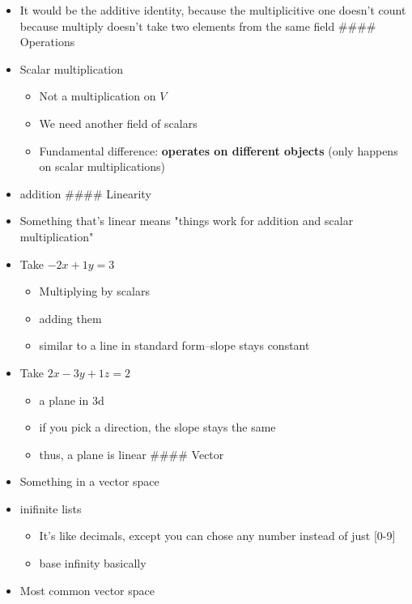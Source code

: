 \documentclass[letterpaper]{article}
\begin{document}
\begin{itemize}
\item It would be the additive identity, because the multiplicitive one
doesn't count because multiply doesn't take two elements from the same
field \#\#\#\# Operations
\item Scalar multiplication

\begin{itemize}
\item Not a multiplication on \(V\)
\item We need another field of scalars
\item Fundamental difference: \textbf{operates on different objects} (only
happens on scalar multiplications)
\end{itemize}

\item addition \#\#\#\# Linearity
\item Something that's linear means "things work for addition and scalar
multiplication"
\item Take \(-2x+1y=3\)

\begin{itemize}
\item Multiplying by scalars
\item adding them
\item similar to a line in standard form--slope stays constant
\end{itemize}

\item Take \(2x-3y+1z=2\)

\begin{itemize}
\item a plane in 3d
\item if you pick a direction, the slope stays the same
\item thus, a plane is linear \#\#\#\# Vector
\end{itemize}

\item Something in a vector space
\item inifinite lists

\begin{itemize}
\item It's like decimals, except you can chose any number instead of just
[0-9]
\item base infinity basically
\end{itemize}

\item Most common vector space


\end{itemize}
\end{document}
